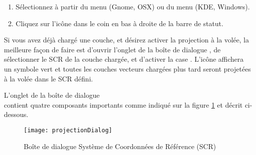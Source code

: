 \begin{enumerate}
\item Sélectionnez  à partir du  menu  (Gnome, OSX) ou du menu  (KDE, Windows).

\item Cliquez sur l'icône  dans le coin en bas à droite de la barre de statut.
\end{enumerate}

Si vous avez déjà chargé une couche, et désirez activer la projection à la volée, la meilleure façon de faire est d'ouvrir l'onglet  de la boîte de dialogue , de sélectionner le SCR de la couche chargée, et d'activer la case . L'icône  affichera un symbole vert et toutes les couches vecteurs chargées plus tard seront projetées à la volée dans le SCR défini.
 
L'onglet  de la boîte de dialogue\\
 contient quatre composants importants comme indiqué sur la figure \ref{fig:projections} et décrit ci-dessous.

\begin{figure}[ht]
   \begin{center}
   \texttt{[image: projectionDialog]}\caption{Boîte de dialogue Système de Coordonnées de Référence (SCR) \nixcaption} \label{fig:projections}
\end{center}
\end{figure}

